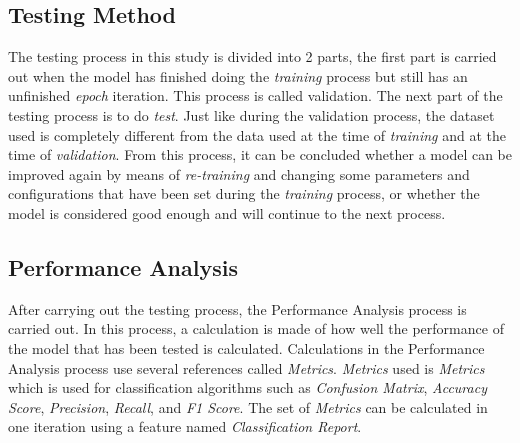 \subsection{Testing Method}

The testing process in this study is divided into 2 parts, the first part is carried out when the model has finished doing the \textit{training} process but still has an unfinished \textit{epoch} iteration. This process is called validation. The next part of the testing process is to do \textit{test}. Just like during the validation process, the dataset used is completely different from the data used at the time of \textit{training} and at the time of \textit{validation}. From this process, it can be concluded whether a model can be improved again by means of \textit{re-training} and changing some parameters and configurations that have been set during the \textit{training} process, or whether the model is considered good enough and will continue to the next process.

\subsection{Performance Analysis}

After carrying out the testing process, the Performance Analysis process is carried out. In this process, a calculation is made of how well the performance of the model that has been tested is calculated. Calculations in the Performance Analysis process use several references called \textit{Metrics}. \textit{Metrics} used is \textit{Metrics} which is used for classification algorithms such as \textit{Confusion Matrix}, \textit{Accuracy Score}, \textit{Precision}, \textit{Recall}, and \textit{F1 Score}. The set of \textit{Metrics} can be calculated in one iteration using a feature named \textit{Classification Report}.